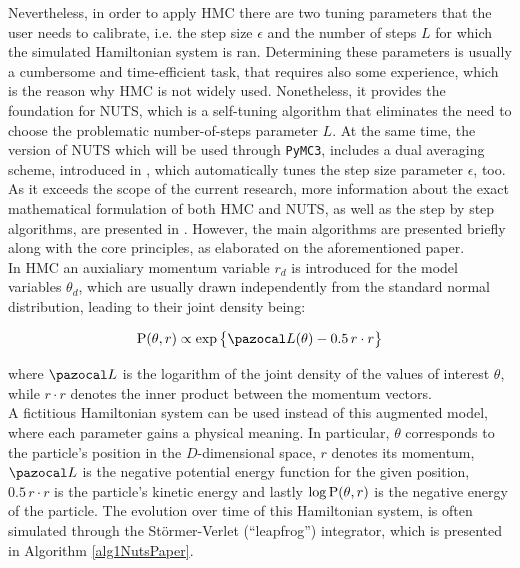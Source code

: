 Nevertheless, in order to apply \gls{HMC} there are two tuning parameters that the user needs to calibrate, i.e. the step size $\epsilon$ and the number of steps $L$ for which the simulated Hamiltonian system is ran. Determining these parameters is usually a cumbersome and time-efficient task, that requires also some experience, which is the reason why \gls{HMC} is not widely used. Nonetheless, it provides the foundation for \gls{NUTS}, which is a self-tuning algorithm that eliminates the need to choose the problematic number-of-steps parameter $L$. At the same time, the version of \gls{NUTS} which will be used through \verb|PyMC3|, includes a dual averaging scheme, introduced in \cite{nesterov2009primal}, which automatically tunes the step size parameter $\epsilon$, too.\\

As it exceeds the scope of the current research, more information about the exact mathematical formulation of both \gls{HMC} and \gls{NUTS}, as well as the step by step algorithms, are presented in \cite{hoffman2014no}. However, the main algorithms are presented briefly along with the core principles, as elaborated on the aforementioned paper.\\

In \gls{HMC} an auxialiary momentum variable $r_d$ is introduced for the model variables $\theta_d$, which are usually drawn independently from the standard normal distribution, leading to their joint density being:

\begin{equation}
    \prob{\theta, r} \propto \exp \big\{ \ccal{L} (\theta) - 0.5\, r\cdot r\big\}
\end{equation}


where $\ccal{L}$ is the logarithm of the joint density of the values of interest $\theta$, while $r \cdot r$ denotes the inner product between the momentum vectors. \\

A fictitious Hamiltonian system can be used instead of this augmented model, where each parameter gains a physical meaning. In particular, $\theta$ corresponds to the particle's position in the $D$-dimensional space, $r$ denotes its momentum, $\ccal{L}$ is the negative potential energy function for the given position, $0.5\,r\cdot r$ is the particle's kinetic energy and lastly $\log \text{P}(\theta, r)$ is the negative energy of the particle. The evolution over time of this Hamiltonian system, is often simulated through the St\"{o}rmer-Verlet (``leapfrog'') integrator, which is presented in Algorithm \ref{alg1NutsPaper}.\\

